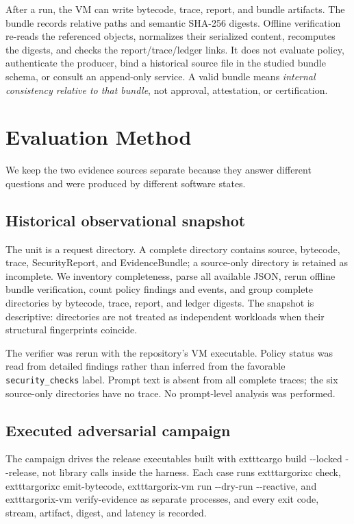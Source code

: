 \documentclass[conference]{IEEEtran}
\newcommand{\code}[1]{\nolinkurl{#1}}
\begin{document}
After a run, the VM can write bytecode, trace, report, and bundle artifacts.
The bundle records relative paths and semantic SHA-256 digests.  Offline
verification re-reads the referenced objects, normalizes their serialized
content, recomputes the digests, and checks the report/trace/ledger links.  It
does not evaluate policy, authenticate the producer, bind a historical source
file in the studied bundle schema, or consult an append-only service.  A valid
bundle means \emph{internal consistency relative to that bundle}, not approval,
attestation, or certification.

\section{Evaluation Method}

We keep the two evidence sources separate because they answer different
questions and were produced by different software states.

\subsection{Historical observational snapshot}

The unit is a request directory.  A complete directory contains source,
bytecode, trace, SecurityReport, and EvidenceBundle; a source-only directory is
retained as incomplete.  We inventory completeness, parse all available JSON,
rerun offline bundle verification, count policy findings and events, and group
complete directories by bytecode, trace, report, and ledger digests.  The
snapshot is descriptive: directories are not treated as independent workloads
when their structural fingerprints coincide.

The verifier was rerun with the repository's VM executable.  Policy status was
read from detailed findings rather than inferred from the favorable
\code{security_checks} label.  Prompt text is absent from all complete traces;
the six source-only directories have no trace.  No prompt-level analysis was
performed.

\subsection{Executed adversarial campaign}

The campaign drives the release executables built with
	exttt{cargo build -{}-locked -{}-release}, not library calls inside the
harness.  Each case runs 	exttt{argorixc check},
	exttt{argorixc emit-bytecode},
	exttt{argorix-vm run -{}-dry-run -{}-reactive}, and
	exttt{argorix-vm verify-evidence} as separate processes, and every exit
code, stream, artifact, digest, and latency is recorded.
\end{document}
